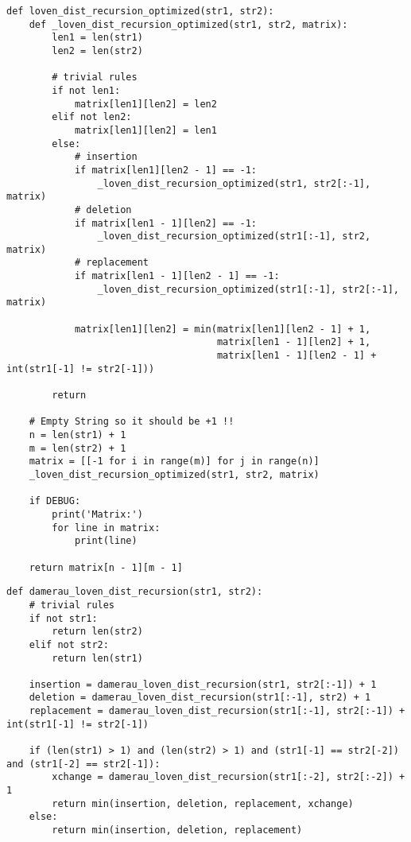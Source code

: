 \begin{lstlisting}[caption=Функция рекурсивного алгоритма поиска расстояния Левенштейна c кешированием,
	label={lev_recursion_optimized}]
	def loven_dist_recursion_optimized(str1, str2):
    def _loven_dist_recursion_optimized(str1, str2, matrix):
        len1 = len(str1)
        len2 = len(str2)

        # trivial rules
        if not len1:
            matrix[len1][len2] = len2
        elif not len2:
            matrix[len1][len2] = len1
        else:
            # insertion
            if matrix[len1][len2 - 1] == -1:
                _loven_dist_recursion_optimized(str1, str2[:-1], matrix)
            # deletion
            if matrix[len1 - 1][len2] == -1:
                _loven_dist_recursion_optimized(str1[:-1], str2, matrix)
            # replacement
            if matrix[len1 - 1][len2 - 1] == -1:
                _loven_dist_recursion_optimized(str1[:-1], str2[:-1], matrix)

            matrix[len1][len2] = min(matrix[len1][len2 - 1] + 1,
                                     matrix[len1 - 1][len2] + 1,
                                     matrix[len1 - 1][len2 - 1] + int(str1[-1] != str2[-1]))

        return

    # Empty String so it should be +1 !!
    n = len(str1) + 1
    m = len(str2) + 1
    matrix = [[-1 for i in range(m)] for j in range(n)]
    _loven_dist_recursion_optimized(str1, str2, matrix)

    if DEBUG:
        print('Matrix:')
        for line in matrix:
            print(line)

    return matrix[n - 1][m - 1]

\end{lstlisting}

\begin{lstlisting}[caption=Функция рекурсивного алгоритма поиска расстояния Дамерау-Левенштейна,
	label={dlev_recursion}]
	def damerau_loven_dist_recursion(str1, str2):
    # trivial rules
    if not str1:
        return len(str2)
    elif not str2:
        return len(str1)

    insertion = damerau_loven_dist_recursion(str1, str2[:-1]) + 1
    deletion = damerau_loven_dist_recursion(str1[:-1], str2) + 1
    replacement = damerau_loven_dist_recursion(str1[:-1], str2[:-1]) + int(str1[-1] != str2[-1])

    if (len(str1) > 1) and (len(str2) > 1) and (str1[-1] == str2[-2]) and (str1[-2] == str2[-1]):
        xchange = damerau_loven_dist_recursion(str1[:-2], str2[:-2]) + 1
        return min(insertion, deletion, replacement, xchange)
    else:
        return min(insertion, deletion, replacement)

\end{lstlisting}

